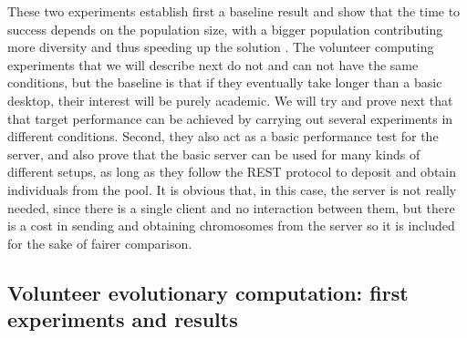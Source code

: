 \documentclass[journal,onecolumn]{IEEEtran}
\begin{document}
These two experiments establish first a baseline result and show that
the time to success depends on the population size, with a bigger population
contributing more diversity and thus speeding up the solution \cite{DBLP:conf/lion/LaredoDFGB13}. The volunteer computing
experiments that we will describe next do not and can not have the
same conditions, but
the baseline is that if they eventually take longer than a basic
desktop, their interest will be purely academic. We will try and
prove next that that target performance can be achieved by carrying
out several experiments in different conditions. Second, they also act
as a basic performance test for the server, and also prove that the
basic server can be used for many kinds of different setups, as long
as they follow the REST protocol to deposit and obtain individuals
from the pool. It is obvious that, in this case, the server is not
really needed, since there is a single client and no interaction
between them, but there is a cost in sending and obtaining chromosomes
from the server so it is included for the sake of fairer comparison.

\subsection{Volunteer evolutionary computation: first experiments and results}
\end{document}
